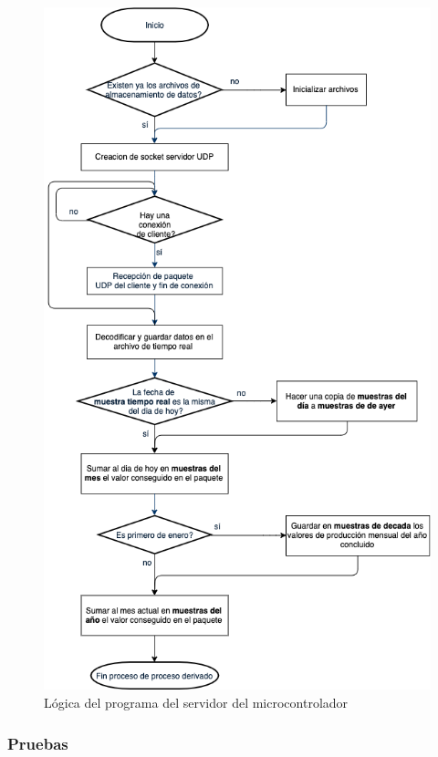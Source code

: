\begin{figure}[H]
	\centering
	\includegraphics[scale=.5]{Capitulo5/images/logica_server_udp.png}
	\caption{Lógica del programa del servidor del microcontrolador}
	\label{fig:programa del servidor microcontrolador}
\end{figure} 

\subsubsection{Pruebas}

